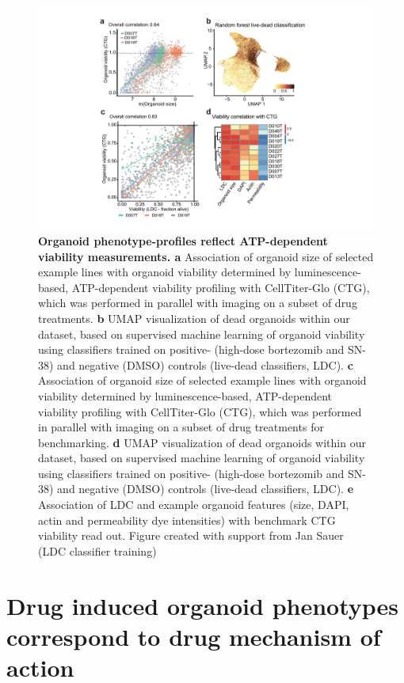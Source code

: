\begin{flushleft}
\begin{figure}[h]
\centering
\includegraphics[width=\textwidth,
                height=\textheight,
                keepaspectratio]{figures/pdf/fig_162.pdf}
\caption{\textbf{Organoid phenotype-profiles reflect ATP-dependent viability measurements. a} Association of organoid size of selected example lines with organoid viability determined by luminescence-based, ATP-dependent viability profiling with CellTiter-Glo (CTG), which was performed in parallel with imaging on a subset of drug treatments. \textbf{b} UMAP visualization of dead organoids within our dataset, based on supervised machine learning of organoid viability using classifiers trained on positive- (high-dose bortezomib and SN-38) and negative (DMSO) controls (live-dead classifiers, LDC). \textbf{c} Association of organoid size of selected example lines with organoid viability determined by luminescence-based, ATP-dependent viability profiling with CellTiter-Glo (CTG), which was performed in parallel with imaging on a subset of drug treatments for benchmarking. \textbf{d} UMAP visualization of dead organoids within our dataset, based on supervised machine learning of organoid viability using classifiers trained on positive- (high-dose bortezomib and SN-38) and negative (DMSO) controls (live-dead classifiers, LDC). \textbf{e} Association of LDC and example organoid features (size, DAPI, actin and permeability dye intensities) with benchmark CTG viability read out. Figure created with support from Jan Sauer (LDC classifier training)}
\label{fig_162}
\end{figure}
\bigbreak

\section{Drug induced organoid phenotypes correspond to drug mechanism of action}


\end{flushleft}
